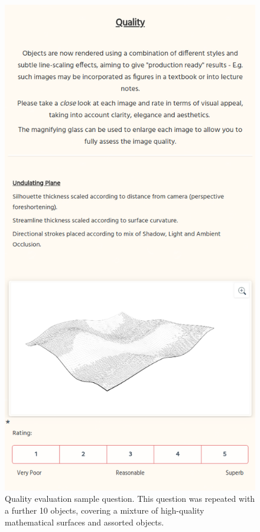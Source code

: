 \begin{figure}[h!]
	\centering
	\includegraphics[height=0.8\textheight]{images/eval_quality.png}
	\caption{Quality evaluation sample question. This question was repeated with a further 10 objects, covering a mixture of high-quality mathematical surfaces and assorted objects.}\label{eval_quality}
\end{figure}

